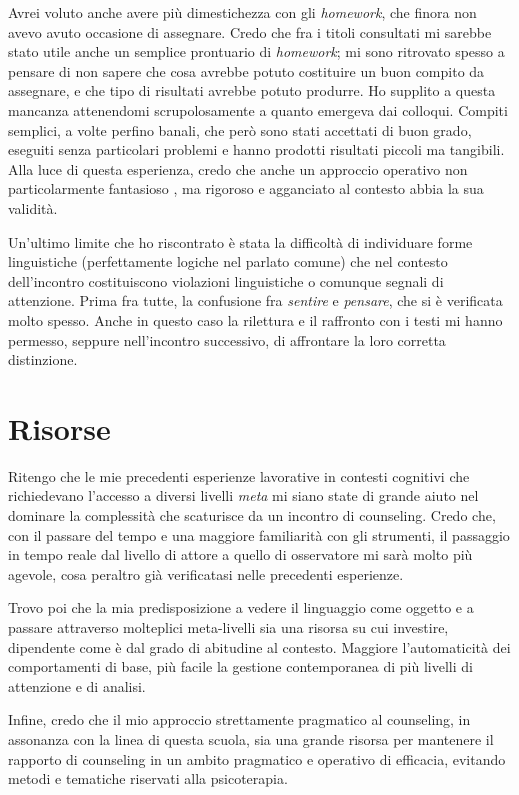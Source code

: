 Avrei voluto anche avere più dimestichezza con gli \emph{homework}, che finora non avevo avuto occasione di assegnare. Credo che fra i titoli consultati mi sarebbe stato utile anche un semplice prontuario di \emph{homework}; mi sono ritrovato spesso a pensare di non sapere che cosa avrebbe potuto costituire un buon compito da assegnare, e che tipo di risultati avrebbe potuto produrre. Ho supplito a questa mancanza attenendomi scrupolosamente a quanto emergeva dai colloqui. Compiti semplici, a volte perfino banali, che però sono stati accettati di buon grado, eseguiti senza particolari problemi e hanno prodotti risultati piccoli ma tangibili. Alla luce di questa esperienza, credo che anche un approccio operativo non particolarmente fantasioso%
%
, ma rigoroso e agganciato al contesto abbia la sua validità.

Un'ultimo limite che ho riscontrato è stata la difficoltà di individuare forme linguistiche (perfettamente logiche nel parlato comune) che nel contesto dell'incontro costituiscono violazioni linguistiche o comunque segnali di attenzione. Prima fra tutte, la confusione fra \emph{sentire} e \emph{pensare}, che si è verificata molto spesso. Anche in questo caso la rilettura e il raffronto con i testi mi hanno permesso, seppure nell'incontro successivo, di affrontare la loro corretta distinzione.

\section{Risorse}\label{sec:risorse}

Ritengo che le mie precedenti esperienze lavorative in contesti cognitivi che richiedevano l'accesso a diversi livelli \emph{meta} mi siano state di grande aiuto nel dominare la complessità che scaturisce da un incontro di counseling. Credo che, con il passare del tempo e una maggiore familiarità con gli strumenti, il passaggio in tempo reale dal livello di attore a quello di osservatore mi sarà molto più agevole, cosa peraltro già verificatasi nelle precedenti esperienze.

Trovo poi che la mia predisposizione a vedere il linguaggio come oggetto e a passare attraverso molteplici meta-livelli sia una risorsa su cui investire, dipendente come è dal grado di abitudine al contesto. Maggiore l'automaticità dei comportamenti di base, più facile la gestione contemporanea di più livelli di attenzione e di analisi.

Infine, credo che il mio approccio strettamente pragmatico al counseling, in assonanza con la linea di questa scuola, sia una grande risorsa per mantenere il rapporto di counseling in un ambito pragmatico e operativo di efficacia, evitando metodi e tematiche riservati alla psicoterapia.

